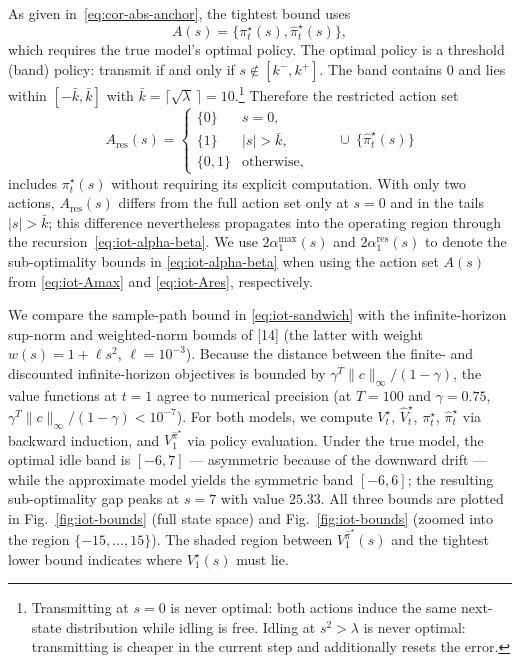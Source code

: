 \documentclass[10pt]{article}
\theoremstyle{definition}
\begin{document}
As given in~\eqref{eq:cor-abs-anchor}, the tightest bound uses
\begin{equation}
A(s) = \{\pi^\star_t(s), \hat\pi^\star_t(s)\},
\label{eq:iot-Amax}
\end{equation}
which requires the true model's optimal policy. The optimal policy is a
threshold (band) policy: transmit if and only if
$s \notin [k^-, k^+]$. The band contains $0$ and lies within
$[-\bar k, \bar k]$ with
$\bar k = \lceil\sqrt{\lambda}\,\rceil = 10$.\footnote{Transmitting at
$s = 0$ is never optimal: both actions induce the same next-state
distribution while idling is free. Idling at $s^2 > \lambda$ is never
optimal: transmitting is cheaper in the current step and additionally
resets the error.} Therefore the restricted action set
\begin{equation}
A_{\mathrm{res}}(s) =
\begin{cases}
  \{0\}    & s = 0,\\
  \{1\}    & |s| > \bar k,\\
  \{0, 1\} & \text{otherwise},
\end{cases}
\qquad \cup\ \{\hat\pi^\star_t(s)\}
\label{eq:iot-Ares}
\end{equation}
includes $\pi^\star_t(s)$ without requiring its explicit computation.
With only two actions, $A_{\mathrm{res}}(s)$ differs from the full
action set only at $s = 0$ and in the tails $|s| > \bar k$; this
difference nevertheless propagates into the operating region through
the recursion~\eqref{eq:iot-alpha-beta}. We use $2\alpha^{\max}_1(s)$
and $2\alpha^{\mathrm{res}}_1(s)$ to denote the sub-optimality bounds
in \eqref{eq:iot-alpha-beta} when using the action set $A(s)$ from
\eqref{eq:iot-Amax} and \eqref{eq:iot-Ares}, respectively.

We compare the sample-path bound in \eqref{eq:iot-sandwich} with the
infinite-horizon sup-norm and weighted-norm bounds of [14] (the latter
with weight $w(s) = 1 + \ell s^2$, $\ell = 10^{-3}$). Because the
distance between the finite- and discounted infinite-horizon objectives
is bounded by $\gamma^T \|c\|_\infty/(1-\gamma)$, the value functions
at $t = 1$ agree to numerical precision (at $T = 100$ and
$\gamma = 0.75$, $\gamma^T\|c\|_\infty/(1-\gamma) < 10^{-7}$). For both
models, we compute $V^\star_t$, $\hat V^\star_t$, $\pi^\star_t$,
$\hat\pi^\star_t$ via backward induction, and $V^{\hat\pi^\star}_1$ via
policy evaluation. Under the true model, the optimal idle band is
$[-6, 7]$ --- asymmetric because of the downward drift --- while the
approximate model yields the symmetric band $[-6, 6]$; the resulting
sub-optimality gap peaks at $s = 7$ with value $25.33$. All three
bounds are plotted in Fig.~\ref{fig:iot-bounds}
(full state space) and Fig.~\ref{fig:iot-bounds}
(zoomed into the region $\{-15, \dots, 15\}$). The shaded region
between $V^{\hat\pi^\star}_1(s)$ and the tightest lower bound indicates
where $V^\star_1(s)$ must lie.
\end{document}
